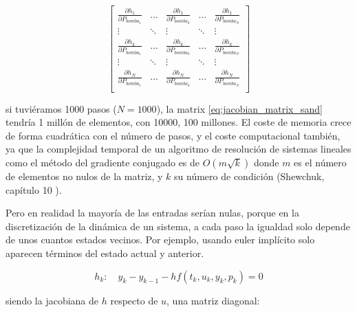 \begin{equation} \label{eq:jacobian_matrix_sand}
	\begin{bmatrix}
		\frac{\partial h_1}{\partial P_{bomba_1}} & \ldots & \frac{\partial h_1}{\partial P_{bomba_k}} & \ldots & \frac{\partial h_1}{\partial P_{bomba_N}} \\
		\vdots                                    & \ddots & \vdots                                    & \ddots & \vdots                                    \\
		\frac{\partial h_k}{\partial P_{bomba_1}} & \ldots & \frac{\partial h_k}{\partial P_{bomba_k}} & \ldots & \frac{\partial h_k}{\partial P_{bomba_N}} \\
		\vdots                                    & \ddots & \vdots                                    & \ddots & \vdots                                    \\
		\frac{\partial h_N}{\partial P_{bomba_1}} & \ldots & \frac{\partial h_N}{\partial P_{bomba_k}} & \ldots & \frac{\partial h_N}{\partial P_{bomba_N}} \\
	\end{bmatrix}
\end{equation}

si tuviéramos 1000 pasos ($N=1000$), la matrix \eqref{eq:jacobian_matrix_sand}
tendría 1 millón de elementos, con 10000, 100 millones. El coste de memoria
crece de forma cuadrática con el número de pasos, y el coste computacional
también, ya que la complejidad temporal de un algoritmo de resolución de
sistemas lineales como el método del gradiente conjugado es de $O(m\sqrt{k})$
donde $m$ es el número de elementos no nulos de la matriz, y $k$ su número de
condición (Shewchuk, capítulo 10 \cite{shewchuk1994introduction}).

Pero en realidad la mayoría de las entradas serían nulas, porque en la
discretización de la dinámica de un sistema, a cada paso la igualdad solo
depende de unos cuantos estados vecinos. Por ejemplo, usando euler implícito
solo aparecen términos del estado actual y anterior.

\begin{equation} \label{eq:implicit_euler_equality}
	h_k: \quad y_k - y_{k-1} - h f(t_k, u_k, y_k, p_k) = 0
\end{equation}

siendo la jacobiana de $h$ respecto de $u$, una matriz diagonal:

